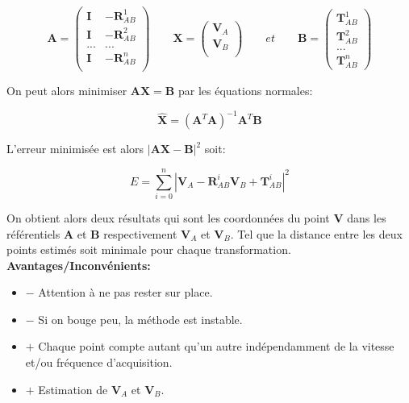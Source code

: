 \documentclass[12pt,a4paper]{article}
\begin{document}
	\[
		\mathbf{A}=\left(
		\begin{array}{c|c}
		\mathbf{I} & -\mathbf{R}^1_{AB}\\
		\mathbf{I} & -\mathbf{R}^2_{AB}\\
		...&...\\
		\mathbf{I} & -\mathbf{R}^n_{AB}\\
		\end{array}
		\right)
		\qquad
		\mathbf{X}=\left(
		\begin{array}{c}
		\mathbf{V}_A \\
		\mathbf{V}_B \\
		\end{array}
		\right)
		\qquad
		et
		\qquad
		\mathbf{B}=
		\left(
		\begin{array}{c}
		\mathbf{T}^1_{AB} \\
		\hline
		\mathbf{T}^2_{AB} \\
		\hline
		...\\
		\hline
		\mathbf{T}^n_{AB}
		\end{array}
		\right)
	\]
	
	On peut alors minimiser $\mathbf{A}\mathbf{X}=\mathbf{B}$ par les équations normales:
	
	\[
		\boxed{\hat{\mathbf{X}}=(\mathbf{A}^T\mathbf{A})^{-1} \mathbf{A}^T \mathbf{B}}
	\]
	
	L'erreur minimisée est alors $|\mathbf{A}\mathbf{X}-\mathbf{B}|^2$ soit:
	
	\[
		\boxed{E=\sum_{i=0}^n |\mathbf{V}_A - \mathbf{R}_{AB}^i \mathbf{V}_B +\mathbf{T}_{AB}^i|^2}
	\]
	
	On obtient alors deux résultats qui sont les coordonnées du point $\mathbf{V}$ dans les référentiels $\mathbf{A}$ et $\mathbf{B}$ respectivement $\mathbf{V}_A$ et $\mathbf{V}_B$. Tel que la distance entre les deux points estimés soit minimale pour chaque transformation.\\
	
	\textbf{Avantages/Inconvénients:}
	\begin{itemize}
		\item $-$ Attention à ne pas rester sur place.
		\item $-$ Si on bouge peu, la méthode est instable.	
		\item $+$ Chaque point compte autant qu'un autre indépendamment de la vitesse et/ou fréquence d'acquisition.
		\item $+$ Estimation de $\mathbf{V}_A$ et $\mathbf{V}_B$.			
	\end{itemize}
	
\end{document}
